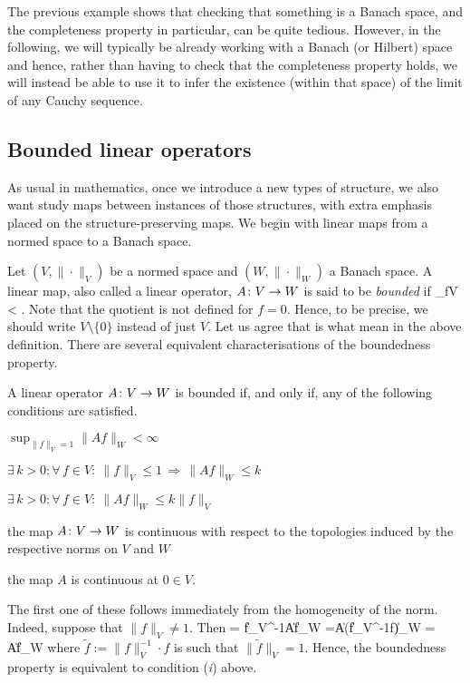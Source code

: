 \br
The previous example shows that checking that something is a Banach space, and the completeness property in particular, can be quite tedious. However, in the following, we will typically be already working with a Banach (or Hilbert) space and hence, rather than having to check that the completeness property holds, we will instead be able to use it to infer the existence (within that space) of the limit of any Cauchy sequence.
\er

\subsection{Bounded linear operators}

As usual in mathematics, once we introduce a new types of structure, we also want study maps between instances of those structures, with extra emphasis placed on the structure-preserving maps. We begin with linear maps from a normed space to a Banach space.

\bd
Let $(V,\|\cdot\|_V)$ be a normed space and $(W,\|\cdot\|_W)$ a Banach space. A linear map, also called a linear operator, $A\colon V\to W$ is said to be \emph{bounded} if
\bse
\sup_{f\in V} < \infty.
\ese
\ed
Note that the quotient is not defined for $f=0$. Hence, to be precise, we should write $V\setminus\{0\}$ instead of just $V$. Let us agree that is what mean in the above definition. There are several equivalent characterisations of the boundedness property.

\bp
A linear operator $A\colon V\to W$ is bounded if, and only if, any of the following conditions are satisfied.
\ben[label=(\roman*)]
\item $\displaystyle \sup_{\|f\|_V=1}\|Af\|_W< \infty$
\item $\exists \, k > 0 : \forall \, f\in V: \ \|f\|_V \leq 1\, \Rightarrow \, \|Af\|_W \leq k$
\item $\exists \, k > 0 : \forall \, f\in V: \ \|Af\|_W\leq  k \|f\|_V$
\item the map $A\colon V \to W$ is continuous with respect to the topologies induced by the respective norms on $V$ and $W$
\item the map $A$ is continuous at $0\in V$. 
\een
\ep

The first one of these follows immediately from the homogeneity of the norm. Indeed, suppose that $\|f\|_V\neq 1$. Then
\bse
{} = \|f\|_V^{-1}\|Af\|_W =\|A(\|f\|_V^{-1}\cdot f)\|_W = \|A\widetilde f\|_W 
\ese
where $\widetilde f:= \|f\|_V^{-1}\cdot f$ is such that $\|\widetilde f\|_V=1$. Hence, the boundedness property is equivalent to condition (\textit{i}) above. 

